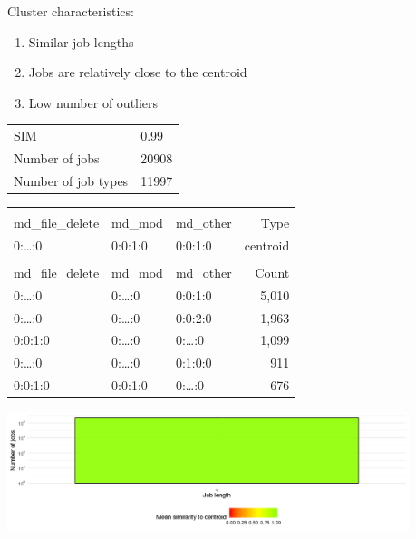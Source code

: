 \documentclass[]{llncs}
\begin{document}
Cluster characteristics:
\begin{enumerate}
 \item Similar job lengths
 \item Jobs are relatively close to the centroid
 \item Low number of outliers
\end{enumerate}
\begingroup
  \centering
  \begin{tabular}{ll}
    SIM & 0.99 \\
    Number of jobs & 20908 \\
    Number of job types & 11997 \\
  \end{tabular}
  \label{tab:hex_native:stats}
\endgroup
\begingroup
  \centering
  \begin{tiny}
    \begin{tabular}{@{ }l@{ }@{ }l@{ }@{ }l@{ }|@{ }r@{ }}
      \rowcolor{tabhcolor}
      \multicolumn{3}{@{ }l|@{ }}{Hexadecimal coding} &            \\ 
      \rowcolor{tabhcolor}
      md\_file\_delete     &  md\_mod   & md\_other & Type     \\ 
      \hline
      0:\dots:0            &  0:0:1:0   & 0:0:1:0   & centroid \\ 
      \multicolumn{4}{l}{} \\ 
      \rowcolor{tabhcolor}
      md\_file\_delete     &  md\_mod   & md\_other & Count    \\ 
      \hline
      0:\dots:0            &  0:\dots:0 & 0:0:1:0   & 5,010    \\ 
      0:\dots:0            &  0:\dots:0 & 0:0:2:0   & 1,963    \\ 
      0:0:1:0              &  0:\dots:0 & 0:\dots:0 & 1,099    \\ 
      0:\dots:0            &  0:\dots:0 & 0:1:0:0   & 911      \\ 
      0:0:1:0              &  0:0:1:0   & 0:\dots:0 & 676      \\ 
    \end{tabular}
  \end{tiny}
  \label{tab:hex_native:top_jobs}
\endgroup
\begingroup
  \centering
  \includegraphics[width=4.61in,height=1.39in]{./media/image8.png}
  \label{fig:hex_native:length}
\endgroup
\end{document}
